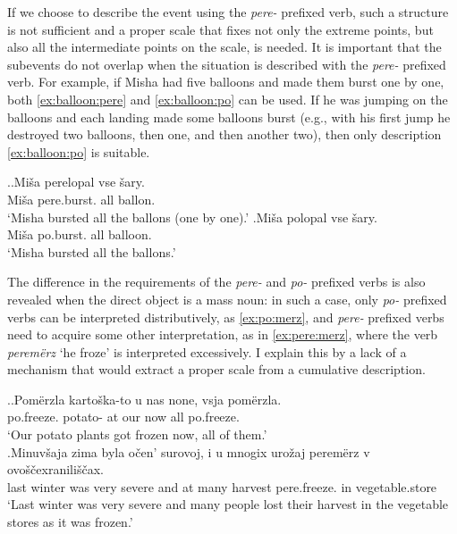 If we choose to describe the event using the \textit{pere-}  prefixed verb, such a structure is not sufficient and a proper scale that fixes not only the extreme points, but also all the intermediate points on the scale, is needed. It is important that the subevents do not overlap when the situation is described with the \textit{pere-}  prefixed verb. For example, if Misha had five balloons and made them burst one by one, both \ref{ex:balloon:pere} and \ref{ex:balloon:po} can be used. If he was jumping on the balloons and each landing made some balloons burst (e.g., with his first jump he destroyed two balloons, then one, and then another two), then only description \ref{ex:balloon:po} is suitable.

\ex.\ag.\label{ex:balloon:pere}Mi\v{s}a perelopal vse \v{s}ary.\\
Mi\v{s}a pere.burst. all ballon.\\
\trans `Misha bursted all the ballons (one by one).'
\bg.\label{ex:balloon:po}Mi\v{s}a polopal vse \v{s}ary.\\
Mi\v{s}a po.burst. all balloon.\\
\trans `Misha bursted all the ballons.'

The difference in the requirements of the \textit{pere-}   and \textit{po-}  prefixed verbs is also revealed when the direct object is a mass noun: in such a case, only \textit{po-}  prefixed verbs can be interpreted distributively, as \ref{ex:po:merz}, and \textit{pere-}  prefixed verbs need to acquire some other interpretation, as in \ref{ex:pere:merz}, where the verb \textit{perem\"{e}rz} `he froze' is interpreted excessively. I explain this by a lack of a mechanism that would extract a proper scale from a cumulative  description.

\ex.\ag.\label{ex:po:merz}Pom\"{e}rzla karto\v{s}ka-to u nas none, vsja pom\"{e}rzla.\\
po.freeze. potato- at our now all po.freeze.\\
\trans `Our potato plants got frozen now, all of them.'\\
\bg.\label{ex:pere:merz}Minuv\v{s}aja zima byla o\v{c}en' surovoj, i u mnogix uro\v{z}aj perem\"{e}rz v ovo\v{s}\v{c}exranili\v{s}\v{c}ax.\\
last winter was very severe and at many harvest pere.freeze. in vegetable.store\\
\trans `Last winter was very severe and many people lost their harvest in the vegetable stores as it was frozen.'

